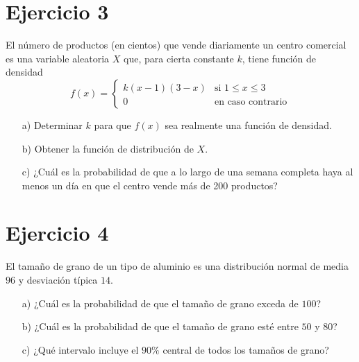 \documentclass[fleqn]{article}
\begin{document}
	\section{Ejercicio 3}
	El número de productos (en cientos) que vende diariamente un centro comercial es una variable aleatoria \( X \) que, para cierta constante \( k \), tiene función de densidad
	\[
	f(x) = 
	\begin{cases}
		k(x - 1)(3 - x) & \text{si } 1 \leq x \leq 3 \\
		0 & \text{en caso contrario}
	\end{cases}
	\]
	\begin{itemize}
		\item[a)] Determinar \( k \) para que \( f(x) \) sea realmente una función de densidad.
		\item[b)] Obtener la función de distribución de \( X \).
		\item[c)] ¿Cuál es la probabilidad de que a lo largo de una semana completa haya al menos un día en que el centro vende más de 200 productos?
	\end{itemize}
	\section{Ejercicio 4}
	El tamaño de grano de un tipo de aluminio es una distribución normal de media \(96\) y desviación típica \(14\).
	\begin{itemize}
		\item[a)] ¿Cuál es la probabilidad de que el tamaño de grano exceda de \(100\)?
		\item[b)] ¿Cuál es la probabilidad de que el tamaño de grano esté entre \(50\) y \(80\)?
		\item[c)] ¿Qué intervalo incluye el \(90\%\) central de todos los tamaños de grano?
	\end{itemize}
\end{document}
